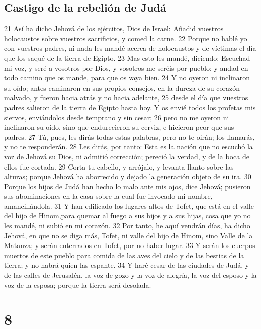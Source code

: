 \section*{Castigo de la rebelión de Judá}

21 Así ha dicho Jehová de los ejércitos, Dios de Israel: Añadid vuestros holocaustos sobre vuestros sacrificios, y comed la carne.
22 Porque no hablé yo con vuestros padres, ni nada les mandé acerca de holocaustos y de víctimas el día que los saqué de la tierra de Egipto.
23 Mas esto les mandé, diciendo: Escuchad mi voz, y seré a vosotros por Dios, y vosotros me seréis por pueblo; y andad en todo camino que os mande, para que os vaya bien.
24 Y no oyeron ni inclinaron su oído; antes caminaron en sus propios consejos, en la dureza de su corazón malvado, y fueron hacia atrás y no hacia adelante,
25 desde el día que vuestros padres salieron de la tierra de Egipto hasta hoy. Y os envié todos los profetas mis siervos, enviándolos desde temprano y sin cesar;
26 pero no me oyeron ni inclinaron su oído, sino que endurecieron su cerviz, e hicieron peor que sus padres.
27 Tú, pues, les dirás todas estas palabras, pero no te oirán; los llamarás, y no te responderán.
28 Les dirás, por tanto: Esta es la nación que no escuchó la voz de Jehová su Dios, ni admitió corrección; pereció la verdad, y de la boca de ellos fue cortada.
29 Corta tu cabello, y arrójalo, y levanta llanto sobre las alturas; porque Jehová ha aborrecido y dejado la generación objeto de su ira.
30 Porque los hijos de Judá han hecho lo malo ante mis ojos, dice Jehová; pusieron sus abominaciones en la casa sobre la cual fue invocado mi nombre, amancillándola.
31 Y han edificado los lugares altos de Tofet, que está en el valle del hijo de Hinom,para quemar al fuego a sus hijos y a sus hijas, cosa que yo no les mandé, ni subió en mi corazón.
32 Por tanto, he aquí vendrán días, ha dicho Jehová, en que no se diga más, Tofet, ni valle del hijo de Hinom, sino Valle de la Matanza; y serán enterrados en Tofet, por no haber lugar.
33 Y serán los cuerpos muertos de este pueblo para comida de las aves del cielo y de las bestias de la tierra; y no habrá quien las espante.
34 Y haré cesar de las ciudades de Judá, y de las calles de Jerusalén, la voz de gozo y la voz de alegría, la voz del esposo y la voz de la esposa; porque la tierra será desolada.

\chapter{8}

